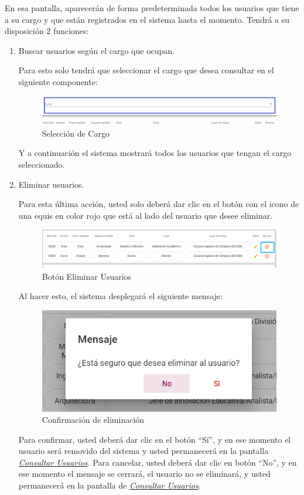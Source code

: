   En esa pantalla, aparecerán de forma predeterminada todos los usuarios que tiene a su cargo y que están registrados en el sistema hasta el momento. Tendrá a su disposición 2 funciones:
  \newpage
  \begin{enumerate}

  	\item   Buscar usuarios según el cargo que ocupan.

  	Para esto solo tendrá que seleccionar el cargo que desea consultar en el siguiente componente:

  	\begin{figure}[H]
  		\centering
  		\hypertarget{cargo1}{\includegraphics[width=0.7\linewidth]{images/SP5/BtnCargo1}}
  		\caption{Selección de Cargo}
  		\label{cargo1}
  	\end{figure}

  	Y a continuación el sistema mostrará todos los usuarios que tengan el cargo seleccionado.

  	   \newpage

  	\item Eliminar usuarios.

  	Para esta última acción, usted solo deberá dar clic en el botón con el icono de una equis en color rojo que está al lado del usuario que desee  eliminar.

  	\begin{figure}[H]
  		\centering
  		\hypertarget{eliminar}{\includegraphics[width=0.7\linewidth]{images/SP5/BtnEliminar}}
  		\caption{Botón Eliminar Usuarios}
  		\label{eliminar}
  	\end{figure}

  	Al hacer esto, el sistema desplegará el siguiente mensaje:

  	\begin{figure}[H]
  		\centering
  		\includegraphics[width=0.4\linewidth]{images/SP5/MSG22}
  		\caption{Confirmación de eliminación}
  		\label{confirmarE}

  	\end{figure}

  	Para confirmar, usted deberá dar clic en el botón “Sí”, y en ese momento el usuario será removido del sistema y usted permanecerá en la pantalla \hyperlink{consultarUs}{\textit{Consultar Usuarios}}.
  	Para cancelar, usted deberá dar clic en botón “No”, y en ese momento el mensaje se cerrará, el usuario no se eliminará, y usted permanecerá en la pantalla de \hyperlink{consultarUs}{\textit{Consultar Usuarios}}.

  \end{enumerate}

